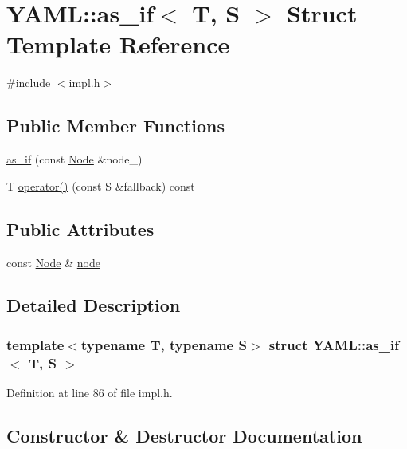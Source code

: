 \hypertarget{struct_y_a_m_l_1_1as__if}{}\section{Y\+A\+ML\+::as\+\_\+if$<$ T, S $>$ Struct Template Reference}
\label{struct_y_a_m_l_1_1as__if}


{\ttfamily \#include $<$impl.\+h$>$}

\subsection*{Public Member Functions}
\begin{DoxyCompactItemize}
\item 
\mbox{\hyperlink{struct_y_a_m_l_1_1as__if_a40acc7855f564f4d467b83a4f3ada97b}{as\+\_\+if}} (const \mbox{\hyperlink{class_y_a_m_l_1_1_node}{Node}} \&node\+\_\+)
\item 
T \mbox{\hyperlink{struct_y_a_m_l_1_1as__if_ad38e1f8b65ab2b4348883c32df8463bc}{operator()}} (const S \&fallback) const
\end{DoxyCompactItemize}
\subsection*{Public Attributes}
\begin{DoxyCompactItemize}
\item 
const \mbox{\hyperlink{class_y_a_m_l_1_1_node}{Node}} \& \mbox{\hyperlink{struct_y_a_m_l_1_1as__if_a3500e52aaa8e80fdd9be76e14286453a}{node}}
\end{DoxyCompactItemize}


\subsection{Detailed Description}
\subsubsection*{template$<$typename T, typename S$>$\newline
struct Y\+A\+M\+L\+::as\+\_\+if$<$ T, S $>$}



Definition at line 86 of file impl.\+h.



\subsection{Constructor \& Destructor Documentation}
\mbox{\label{struct_y_a_m_l_1_1as__if_a40acc7855f564f4d467b83a4f3ada97b}} 
